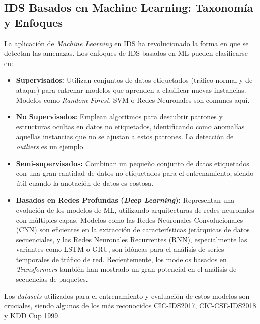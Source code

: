 \subsection{IDS Basados en Machine Learning: Taxonomía y Enfoques}
La aplicación de \textit{Machine Learning} en IDS ha revolucionado la forma en que se detectan las amenazas. Los enfoques de IDS basados en ML pueden clasificarse en:
\begin{itemize}
\item \textbf{Supervisados:} Utilizan conjuntos de datos etiquetados (tráfico normal y de ataque) para entrenar modelos que aprenden a clasificar nuevas instancias. Modelos como \textit{Random Forest}, SVM o Redes Neuronales son comunes aquí.
\item \textbf{No Supervisados:} Emplean algoritmos para descubrir patrones y estructuras ocultas en datos no etiquetados, identificando como anomalías aquellas instancias que no se ajustan a estos patrones. La detección de \textit{outliers} es un ejemplo.
\item \textbf{Semi-supervisados:} Combinan un pequeño conjunto de datos etiquetados con una gran cantidad de datos no etiquetados para el entrenamiento, siendo útil cuando la anotación de datos es costosa.
\item \textbf{Basados en Redes Profundas (\textit{Deep Learning}):} Representan una evolución de los modelos de ML, utilizando arquitecturas de redes neuronales con múltiples capas. Modelos como las Redes Neuronales Convolucionales (CNN) son eficientes en la extracción de características jerárquicas de datos secuenciales, y las Redes Neuronales Recurrentes (RNN), especialmente las variantes como LSTM o GRU, son idóneas para el análisis de series temporales de tráfico de red. Recientemente, los modelos basados en \textit{Transformers} también han mostrado un gran potencial en el análisis de secuencias de paquetes.
\end{itemize}
Los \textit{datasets} utilizados para el entrenamiento y evaluación de estos modelos son cruciales, siendo algunos de los más reconocidos CIC-IDS2017, CIC-CSE-IDS2018 y KDD Cup 1999.

